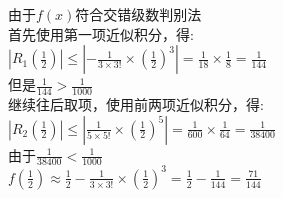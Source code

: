 由于$f(x)$符合交错级数判别法\\
首先使用第一项近似积分，得:\\
$\displaystyle|R_1(\frac{1}{2})|\leqslant|-\frac{1}{3\times 3!}\times(\frac{1}{2})^3|=\frac{1}{18}\times\frac{1}{8}=\frac{1}{144}$\\
但是$\displaystyle\frac{1}{144}>\frac{1}{1000}$\\
继续往后取项，使用前两项近似积分，得:\\
$\displaystyle|R_2(\frac{1}{2})|\leqslant|\frac{1}{5\times 5!}\times(\frac{1}{2})^5|=\frac{1}{600}\times\frac{1}{64}=\frac{1}{38400}$\\
由于$\displaystyle\frac{1}{38400}<\frac{1}{1000}$\\
$\displaystyle f(\frac{1}{2})\approx\frac{1}{2}-\frac{1}{3\times 3!}\times(\frac{1}{2})^3=\frac{1}{2}-\frac{1}{144}=\frac{71}{144}$


